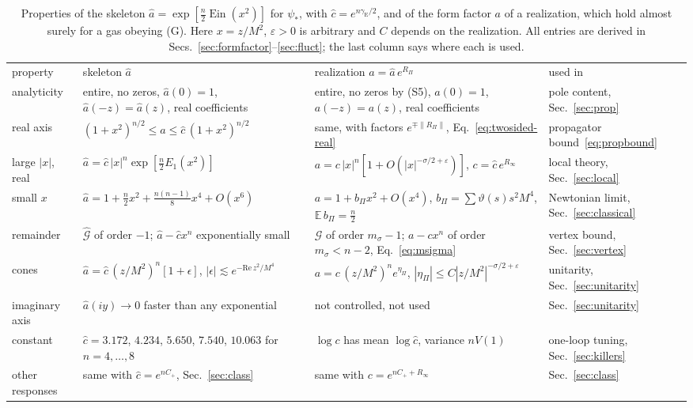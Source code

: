 \documentclass[aps,prd,10pt,twocolumn,superscriptaddress,nofootinbib,floatfix,longbibliography]{revtex4-2}
\newcommand{\bE}{\mathbb{E}}
\newcommand{\Ein}{\operatorname{Ein}}
\newcommand{\gE}{\gamma_{\mathrm E}}
\begin{document}
\begin{table}[t]
\caption{Properties of the skeleton $\hat a=\exp[\frac n2\Ein(x^2)]$ for $\psi_*$, with $\hat c=e^{n\gE/2}$, and of the form factor $a$ of a realization, which hold almost surely for a gas obeying (G). Here $x=z/M^2$, $\varepsilon>0$ is arbitrary and $C$ depends on the realization. All entries are derived in Secs.~\ref{sec:formfactor}--\ref{sec:fluct}; the last column says where each is used.}
\label{tab:a}
\begin{ruledtabular}
\begin{tabular}{p{2.2cm}p{5.9cm}p{5.6cm}p{3.3cm}}
property & skeleton $\hat a$ & realization $a=\hat a\,e^{R_\Pi}$ & used in\\
\colrule
analyticity & entire, no zeros, $\hat a(0)=1$, $\hat a(-z)=\hat a(z)$, real coefficients & entire, no zeros by (S5), $a(0)=1$, $a(-z)=a(z)$, real coefficients & pole content, Sec.~\ref{sec:prop}\\
real axis & $(1+x^2)^{n/2}\le\hat a\le\hat c\,(1+x^2)^{n/2}$ & same, with factors $e^{\mp\|R_\Pi\|}$, Eq.~\eqref{eq:twosided-real} & propagator bound~\eqref{eq:propbound}\\
large $|x|$, real & $\hat a=\hat c\,|x|^n\exp[\frac n2E_1(x^2)]$ & $a=c\,|x|^n[1+O(|x|^{-\sigma/2+\varepsilon})]$, $c=\hat c\,e^{R_\infty}$ & local theory, Sec.~\ref{sec:local}\\
small $x$ & $\hat a=1+\frac n2x^2+\frac{n(n-1)}8x^4+O(x^6)$ & $a=1+b_\Pi x^2+O(x^4)$, $b_\Pi=\sum\vartheta(s)s^2M^4$, $\bE\,b_\Pi=\frac n2$ & Newtonian limit, Sec.~\ref{sec:classical}\\
remainder & $\hat{\mathcal G}$ of order $-1$; $\hat a-\hat cx^n$ exponentially small & $\mathcal G$ of order $m_\sigma-1$; $a-cx^n$ of order $m_\sigma<n-2$, Eq.~\eqref{eq:msigma} & vertex bound, Sec.~\ref{sec:vertex}\\
cones & $\hat a=\hat c\,(z/M^2)^n[1+\epsilon]$, $|\epsilon|\lesssim e^{-\mathrm{Re}\,z^2/M^4}$ & $a=c\,(z/M^2)^ne^{\eta_\Pi}$, $|\eta_\Pi|\le C|z/M^2|^{-\sigma/2+\varepsilon}$ & unitarity, Sec.~\ref{sec:unitarity}\\
imaginary axis & $\hat a(iy)\to0$ faster than any exponential & not controlled, not used & Sec.~\ref{sec:unitarity}\\
constant & $\hat c=3.172$, $4.234$, $5.650$, $7.540$, $10.063$ for $n=4,\dots,8$ & $\log c$ has mean $\log\hat c$, variance $nV(1)$ & one-loop tuning, Sec.~\ref{sec:killers}\\
other responses & same with $\hat c=e^{nC_+}$, Sec.~\ref{sec:class} & same with $c=e^{nC_++R_\infty}$ & Sec.~\ref{sec:class}\\
\end{tabular}
\end{ruledtabular}
\end{table}
\end{document}
